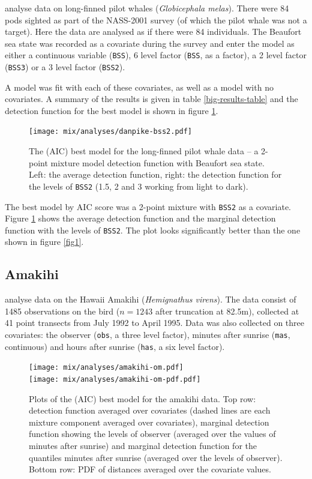  analyse data on long-finned pilot whales (\textit{Globicephala melas}). There were 84 pods sighted as part of the NASS-2001 survey (of which the pilot whale was not a target). Here the data are analysed as if there were 84 individuals. The Beaufort sea state was recorded as a covariate during the survey and enter the model as either a continuous variable (\texttt{BSS}), 6 level factor (\texttt{BSS}, as a factor), a 2 level factor (\texttt{BSS3}) or a 3 level factor (\texttt{BSS2}).

A model was fit with each of these covariates, as well as a model with no covariates. A summary of the results is given in table \ref{big-results-table} and the detection function for the best model is shown in figure \ref{danpike-detfct}.

\begin{figure}[t]
\centering
\texttt{[image: mix/analyses/danpike-bss2.pdf]}
\caption{The (AIC) best model for the long-finned pilot whale data -- a 2-point mixture model detection function with Beaufort sea state. Left: the average detection function, right: the detection function for the levels of \texttt{BSS2} (1.5, 2 and 3 working from light to dark).\label{cor-e16}}
\label{danpike-detfct}
\end{figure}

The best model by AIC score was a 2-point mixture with \texttt{BSS2} as a covariate. Figure \ref{danpike-detfct} shows the average detection function and the marginal detection function with the levels of \texttt{BSS2}. The plot looks significantly better than the one shown in figure \ref{fig1}.

\subsection{Amakihi}
 analyse data on the Hawaii Amakihi (\textit{Hemignathus virens}). The data consist of 1485 observations on the bird ($n=1243$ after truncation at 82.5m), collected at 41 point transects from July 1992 to April 1995. Data was also collected on three covariates: the observer (\texttt{obs}, a three level factor), minutes after sunrise (\texttt{mas}, continuous) and hours after sunrise (\texttt{has}, a six level factor).

\begin{figure}[t]
\centering
\texttt{[image: mix/analyses/amakihi-om.pdf]}\\
\texttt{[image: mix/analyses/amakihi-om-pdf.pdf]}
\caption{Plots of the (AIC) best model for the amakihi data. Top row: detection function averaged over covariates (dashed lines are each mixture component averaged over covariates), marginal detection function showing the levels of observer (averaged over the values of minutes after sunrise) and marginal detection function for the quantiles minutes after sunrise (averaged over the levels of observer). Bottom row: PDF of distances averaged over the covariate values.}
\label{amakihi}
\end{figure}

